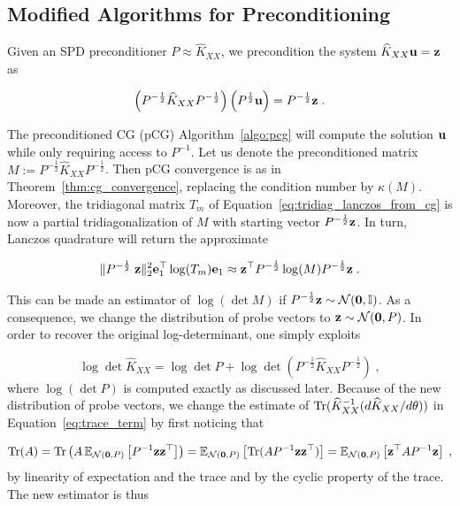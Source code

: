 \documentclass{article}
\begin{document}
\subsection{Modified Algorithms for Preconditioning}

Given an SPD preconditioner $P \approx \widehat K_{XX}$, we precondition the system $\widehat K_{XX} \boldsymbol{\mathbf{u}} = \boldsymbol{\mathbf{z}}$ as

\begin{equation} \label{eq:precond_linsys}
    \left( P^{-\frac 1 2} \widehat K_{XX} P^{-\frac 1 2} \right) \left( P^{\frac 1 2} \boldsymbol{\mathbf{u}}\right) = P^{-\frac 1 2} \boldsymbol{\mathbf{z}} \; .
\end{equation}

The preconditioned CG (pCG) Algorithm~\ref{algo:pcg} will compute the solution $\boldsymbol{\mathbf{u}}$ while only requiring access to $P^{-1}$. Let us denote the preconditioned matrix $M := P^{-\frac 1 2} \widehat K_{XX} P^{-\frac 1 2}$. Then pCG convergence is as in Theorem~\ref{thm:cg_convergence}, replacing the condition number by $\kappa(M)$. 
Moreover, the tridiagonal matrix $T_m$ of Equation~\eqref{eq:tridiag_lanczos_from_cg} is now a partial tridiagonalization of $M$ with starting vector $P^{-\frac 1 2} \boldsymbol{\mathbf{z}}$. In turn, Lanczos quadrature will return the approximate

\begin{equation*}
    \Vert P^{-\frac 1 2} \; \boldsymbol{\mathbf{z}} \Vert_2^2 \boldsymbol{\mathbf{e}}_1^\top \log(T_m) \boldsymbol{\mathbf{e}}_1 
    \approx \boldsymbol{\mathbf{z}}^\top  P^{-\frac 1 2} \log(M) P^{-\frac 1 2} \boldsymbol{\mathbf{z}}  \; .    
\end{equation*}

This can be made an estimator of $\log(\det M)$ if $P^{-\frac 1 2} \vect z \sim \mathcal N(\vect 0, \Id)$. As a consequence, we change the distribution of probe vectors to $\boldsymbol{\mathbf{z}} \sim \mathcal N(\boldsymbol{\mathbf{0}}, P)$. In order to recover the original log-determinant, one simply exploits

\begin{equation} \label{eq:logdet_precond}
    \log\det \widehat K_{XX} = \log \det P + \log \det \left(P^{-\frac 1 2} \widehat K_{XX} P^{-\frac 1 2} \right) \; ,
\end{equation}
%
where $\log(\det P)$ is computed exactly as discussed later. Because of the new distribution of probe vectors, we change the estimate of $\operatorname{Tr}( \widehat K_{XX}^{-1} (d \widehat K_{XX} / d\theta))$ in Equation~\ref{eq:trace_term} by first noticing that

\begin{equation*}
    \operatorname{Tr}(A) = \operatorname{Tr} \left( A \operatorname{\mathbb{E}}_{\mathcal N(\boldsymbol{\mathbf{0}}, P)} \left[ P^{-1} \boldsymbol{\mathbf{z}} \boldsymbol{\mathbf{z}}^\top \right] \right) 
    = \operatorname{\mathbb{E}}_{\mathcal N(\boldsymbol{\mathbf{0}}, P)} \left[ \operatorname{Tr}(A P^{-1} \boldsymbol{\mathbf{z}} \boldsymbol{\mathbf{z}}^\top ) \right]
    = \operatorname{\mathbb{E}}_{\mathcal N(\boldsymbol{\mathbf{0}}, P)} \left[ \boldsymbol{\mathbf{z}}^\top A P^{-1} \boldsymbol{\mathbf{z}} \right] \; ,
\end{equation*}
%
by linearity of expectation and the trace and by the cyclic property of the trace. The new estimator is thus
\end{document}
